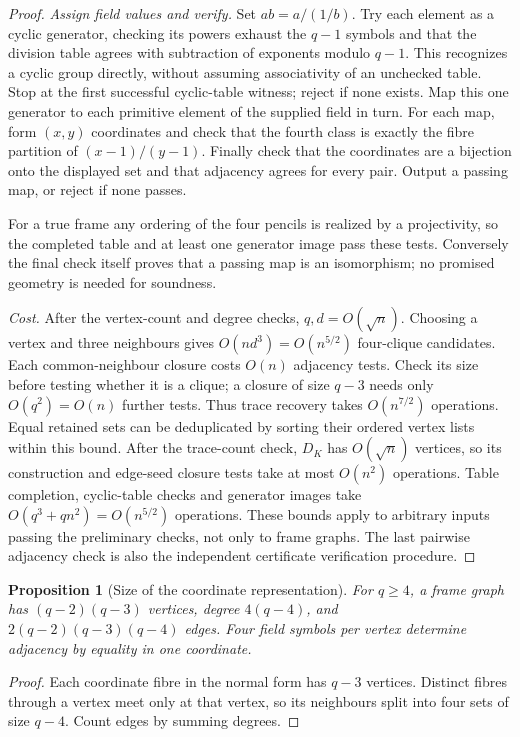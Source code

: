 \documentclass[11pt]{article}
\newtheorem{proposition}[theorem]{Proposition}
\theoremstyle{definition}
\theoremstyle{remark}
\begin{document}
\begin{proof}
\emph{Assign field values and verify.}
Set $ab=a/(1/b)$. Try each element as a cyclic generator, checking its
powers exhaust the $q-1$ symbols and that the division table agrees
with subtraction of exponents modulo $q-1$. This recognizes a cyclic
group directly, without assuming associativity of an unchecked table.
Stop at the first successful cyclic-table witness; reject if none exists.
Map this one generator to each primitive element of the supplied field in turn.
For each map, form $(x,y)$ coordinates and check that the fourth class
is exactly the fibre partition of $(x-1)/(y-1)$. Finally check that the
coordinates are a bijection onto the displayed set and that adjacency
agrees for every pair. Output a passing map, or reject if none passes.

For a true frame any ordering of the four pencils is realized by a
projectivity, so the completed table and at least one generator image
pass these tests. Conversely the final check itself proves that a passing
map is an isomorphism; no promised geometry is needed for soundness.

\emph{Cost.}
After the vertex-count and degree checks, $q,d=O(\sqrt n)$.
Choosing a vertex and three neighbours gives $O(nd^3)=O(n^{5/2})$
four-clique candidates. Each common-neighbour closure costs $O(n)$
adjacency tests. Check its size before testing whether it is a clique;
a closure of size $q-3$ needs only $O(q^2)=O(n)$ further tests.
Thus trace recovery takes $O(n^{7/2})$ operations. Equal retained sets
can be deduplicated by sorting their ordered vertex lists within this bound.
After the trace-count check, $D_K$ has $O(\sqrt n)$ vertices, so its
construction and edge-seed closure tests take at most $O(n^2)$ operations.
Table completion, cyclic-table checks and generator images take
$O(q^3+qn^2)=O(n^{5/2})$ operations. These bounds apply to arbitrary
inputs passing the preliminary checks, not only to frame graphs.
The last pairwise adjacency check is also the independent certificate
verification procedure.
\end{proof}

\begin{proposition}[Size of the coordinate representation]\label{prop:size}
For $q\ge4$, a frame graph has $(q-2)(q-3)$ vertices, degree $4(q-4)$, and
$2(q-2)(q-3)(q-4)$ edges. Four field symbols per vertex determine
adjacency by equality in one coordinate.
\end{proposition}
\begin{proof}
Each coordinate fibre in the normal form has $q-3$ vertices. Distinct
fibres through a vertex meet only at that vertex, so its neighbours
split into four sets of size $q-4$. Count edges by summing degrees.
\end{proof}
\end{document}
